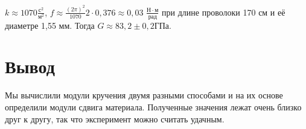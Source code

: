 \documentclass[a4paper, 12pt]{article}
\begin{document}
			\begin{figure}[h]
			\end{figure}
			
			$k \approx 1070 \frac{с^2}{м^2}$, $f \approx \frac{(2 \pi)^2}{1070} 2 \cdot 0,376 \approx 0,03$ $\frac{Н \cdot м}{рад}$  при длине проволоки 170 см и её диаметре 1,55 мм. Тогда $G \approx 83,2 \pm 0,2 ГПа$.
	\section*{Вывод}
		Мы вычислили модули кручения двумя разными способами и на их основе определили модули сдвига материала. Полученные значения лежат очень близко друг к другу, так что эксперимент можно считать удачным.
\end{document}
